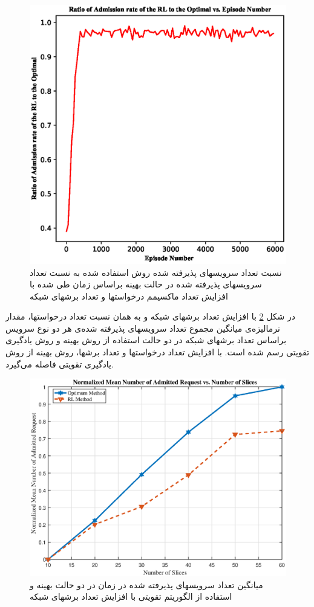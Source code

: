 \begin{figure}%
	\centering
	\includegraphics[scale = 0.6]{./fig/dynamicEpoch1_0} %
	\caption{  نسبت تعداد سرویسهای پذیرفته شده روش استفاده شده به نسبت تعداد سرویسهای پذیرفته شده در حالت بهینه براساس زمان طی شده با افزایش تعداد ماکسیمم درخواستها و تعداد برشهای شبکه}
	\label{fig:dynamicEpoch1}
\end{figure}
در شکل \ref{fig:admittedService}
با افزایش تعداد برشهای شبکه و به همان نسبت تعداد درخواستها، مقدار نرمالیزه‌ی میانگین مجموع تعداد سرویسهای پذیرفته شده‌ی هر دو نوع سرویس براساس  تعداد برشهای شبکه در دو حالت استفاده از روش بهینه و روش یادگیری تقویتی رسم شده است. با افزایش تعداد درخواستها و تعداد برشها، روش بهینه از روش یادگیری تقویتی فاصله می‌گیرد.

\begin{figure}%
	\centering
	\includegraphics[scale = 0.6]{./fig/admittedService1} %
	\caption{  
		میانگین تعداد سرویسهای پذیرفته شده در زمان در دو حالت بهینه و استفاده از الگوریتم تقویتی با افزایش تعداد برشهای شبکه}
	\label{fig:admittedService}
\end{figure}
